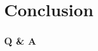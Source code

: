 \documentclass[aspectratio=169]{beamer}
\title{\deliv{\srs}{Presentation}}
\date{\datesrs}
\begin{document}

\begin{frame}
\maketitle
\begin{center}
\names
\end{center}
\end{frame}

\begin{frame}
\tableofcontents
\end{frame}







\section{Conclusion}

\begin{frame}
\frametitle{Q \& A}
\github
\end{frame}

\end{document}
